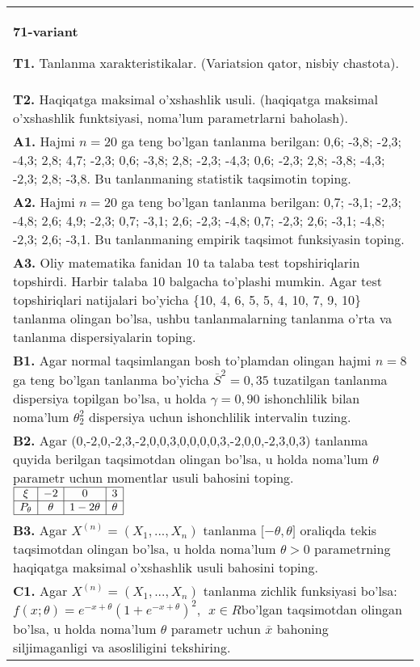 \documentclass{article}
\begin{document}
\begin{tabular}{m{17cm}}
\textbf{71-variant}
\newline

\textbf{T1.} 
Tanlanma xarakteristikalar. (Variatsion qator, nisbiy chastota).
\\
\textbf{T2.} 
Haqiqatga maksimal o'xshashlik usuli. (haqiqatga maksimal o'xshashlik funktsiyasi, noma'lum parametrlarni baholash).
\\
\textbf{A1.} 
Hajmi \(n = 20\) ga teng bo'lgan tanlanma berilgan: 0,6; -3,8; -2,3; -4,3; 2,8; 4,7; -2,3; 0,6; -3,8; 2,8; -2,3; -4,3; 0,6; -2,3; 2,8; -3,8; -4,3; -2,3; 2,8; -3,8. Bu tanlanmaning statistik taqsimotin toping.
\\
\textbf{A2.} 
Hajmi \(n = 20\) ga teng bo'lgan tanlanma berilgan: 0,7; -3,1; -2,3; -4,8; 2,6; 4,9; -2,3; 0,7; -3,1; 2,6; -2,3; -4,8; 0,7; -2,3; 2,6; -3,1; -4,8; -2,3; 2,6; -3,1. Bu tanlanmaning empirik taqsimot funksiyasin toping.
\\
\textbf{A3.} 
Oliy matematika fanidan 10 ta talaba test topshiriqlarin topshirdi. Harbir talaba 10 balgacha to'plashi mumkin. Agar test topshiriqlari natijalari bo'yicha \{10, 4, 6, 5, 5, 4, 10, 7, 9, 10\} tanlanma olingan bo'lsa, ushbu tanlanmalarning tanlanma o'rta va tanlanma dispersiyalarin toping.
\\
\textbf{B1.} 
Agar normal taqsimlangan bosh to'plamdan olingan hajmi \(n = 8\) ga teng bo'lgan tanlanma bo'yicha \({\overline{S}}^{2} = 0,35\) tuzatilgan tanlanma dispersiya topilgan bo'lsa, u holda \(\gamma = 0,90\) ishonchlilik bilan noma'lum \(\theta_{2}^{2}\) dispersiya uchun ishonchlilik intervalin tuzing.
\\
\textbf{B2.} 
Agar (0,-2,0,-2,3,-2,0,0,3,0,0,0,0,3,-2,0,0,-2,3,0,3) tanlanma quyida berilgan taqsimotdan olingan bo'lsa, u holda noma'lum \(\theta\) parametr uchun momentlar usuli bahosini toping.
$\begin{array}{|c|c|c|c|}
    \hline
    \xi & - 2 & 0 & 3 \\
    \hline
    P_{\theta} & \theta & 1 - 2\theta & \theta \\
    \hline
\end{array}$
\\
\textbf{B3.} 
Agar \(X^{(n)} = \left( X_{1},...,X_{n} \right)\) tanlanma \(\lbrack - \theta,\theta\rbrack\) oraliqda tekis taqsimotdan olingan bo'lsa, u holda noma'lum \(\theta > 0\) parametrning haqiqatga maksimal o'xshashlik usuli bahosini toping.
\\
\textbf{C1.} 
Agar \(X^{(n)} = \left( X_{1},...,X_{n} \right)\) tanlanma zichlik funksiyasi bo'lsa: \(f(x;\theta) = e^{- x + \theta}\left( 1 + e^{- x + \theta} \right)^{2},\ \ x \in R\)bo'lgan taqsimotdan olingan bo'lsa, u holda noma'lum \(\theta\) parametr uchun \(\overline{x}\) bahoning siljimaganligi va asosliligini tekshiring.

\end{tabular}
\end{document}
